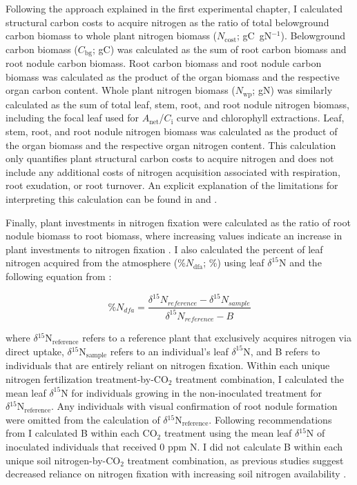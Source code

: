 Following the approach explained in the first experimental chapter, I calculated structural carbon costs to acquire nitrogen as the ratio of total belowground carbon biomass to whole plant nitrogen biomass ($N_\mathrm{cost}$; gC\ gN$^{-1}$). Belowground carbon biomass ($C_\mathrm{bg}$; gC) was calculated as the sum of root carbon biomass and root nodule carbon biomass. Root carbon biomass and root nodule carbon biomass was calculated as the product of the organ biomass and the respective organ carbon content. Whole plant nitrogen biomass ($N_\mathrm{wp}$; gN) was similarly calculated as the sum of total leaf, stem, root, and root nodule nitrogen biomass, including the focal leaf used for $A_\mathrm{net}$/$C_\mathrm{i}$ curve and chlorophyll extractions. Leaf, stem, root, and root nodule nitrogen biomass was calculated as the product of the organ biomass and the respective organ nitrogen content. This calculation only quantifies plant structural carbon costs to acquire nitrogen and does not include any additional costs of nitrogen acquisition associated with respiration, root exudation, or root turnover. An explicit explanation of the limitations for interpreting this calculation can be found in  and .

Finally, plant investments in nitrogen fixation were calculated as the ratio of root nodule biomass to root biomass, where increasing values indicate an increase in plant investments to nitrogen fixation . I also calculated the percent of leaf nitrogen acquired from the atmosphere (\%$N_\mathrm{dfa}$; \%) using leaf $\delta^{15}$N and the following equation from :

\begin{equation} \label{eqn_5.11}
    \%N_{dfa} = \frac{\delta^{15}N{}_{reference} - \delta^{15}N{}_{sample}}{\delta^{15}N{}_{reference} - B}
\end{equation}
    
\noindent where $\delta\mathrm{^{15}{N}_{reference}}$ refers to a reference plant that exclusively acquires nitrogen via direct uptake, $\delta\mathrm{^{15}{N}_{sample}}$ refers to an individual’s leaf $\delta^{15}$N, and B refers to individuals that are entirely reliant on nitrogen fixation. Within each unique nitrogen fertilization treatment-by-CO$_2$ treatment combination, I calculated the mean leaf $\delta^{15}$N for individuals growing in the non-inoculated treatment for $\delta\mathrm{^{15}{N}_{reference}}$. Any individuals with visual confirmation of root nodule formation were omitted from the calculation of $\delta\mathrm{^{15}{N}_{reference}}$. Following recommendations from  I calculated B within each CO$_2$ treatment using the mean leaf $\delta\mathrm{^{15}{N}}$ of inoculated individuals that received 0 ppm N. I did not calculate B within each unique soil nitrogen-by-CO$_2$ treatment combination, as previous studies suggest decreased reliance on nitrogen fixation with increasing soil nitrogen availability .

